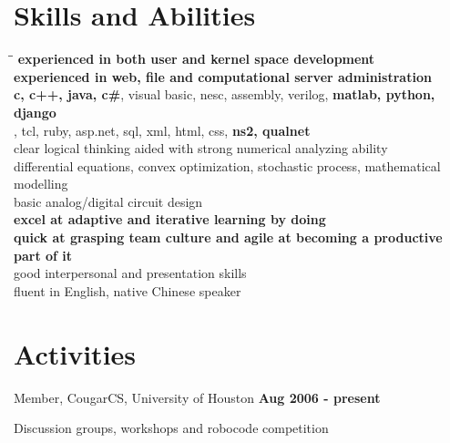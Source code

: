 \documentclass[overlapped, line]{resume}
\begin{document}
\begin{resume}
         \vspace{-15pt}\section{Skills and Abilities} 
         \begin{tabbing}
           \= \hspace{1.5in}\= \kill
            \>\textbf{experienced in both user and kernel space development}\\
            \>\textbf{experienced in web, file and computational server administration}\\
            \>\textbf{c, c++, java, c\#}, visual basic, nesc, assembly, verilog, \textbf{matlab, python, django}\\
           \> , tcl, ruby, asp.net, sql, xml, html, css, {\bf ns2, qualnet}\\
            \>clear logical thinking aided with strong numerical analyzing ability\\
            \>differential equations, convex optimization, stochastic process, mathematical modelling\\
            \>basic analog/digital circuit design\\
            \> {\bf excel at adaptive and iterative learning by doing}\\
            \> {\bf quick at grasping team culture and agile at becoming a productive} \\
           \> \> {\bf part of it}\\
            \>good interpersonal and presentation skills\\
           \> \>fluent in English, native Chinese speaker

         \end{tabbing}

         \vspace{-15pt}\section{Activities}
         Member, CougarCS, University of Houston  \hfill {\bf Aug 2006 - present}\\
         \vspace{-10pt}      %
         \begin{list2}
         \item Discussion groups, workshops and robocode competition
         \end{list2}  \vspace{-5pt}


\end{resume}
\end{document}
